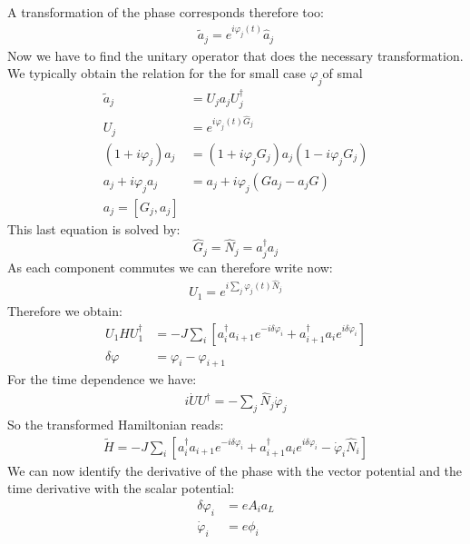 \documentclass[10pt]{article}
\newcommand{\ch}{e}
\newcommand{\aL}{a_L}
\begin{document}
A transformation of the phase corresponds therefore too:
\begin{align}
\tilde{a}_j = e^{i\varphi_j(t)}\hat{a}_j
\end{align}
Now we have to find the unitary operator that does the necessary transformation. We typically obtain the relation for the for small  case $\varphi_j$of smal
\begin{eqnarray}
\tilde{a}_j &= U_j a_j U_j^\dag\\
U_j &= e^{i\varphi_j(t)\hat{G}_j}\\
(1+i\varphi_j)a_j &= (1+i\varphi_j G_j)a_j (1-i\varphi_j G_j)\\
a_j +i\varphi_ja_j &= a_j + i\varphi_j (Ga_j - a_jG)\\
 a_j = [G_j,a_j]
\end{eqnarray}
This last equation is solved by:
\begin{equation}
\hat{G}_j = \hat{N}_j = a^\dag_j a_j
\end{equation}
As each component commutes we can therefore write now:
\begin{align}
U_1 = e^{i\sum_j \varphi_j(t) \hat{N}_j}
\end{align}
Therefore we obtain:
\begin{eqnarray}
U_1HU_1^\dag &= -J\sum_i \left[a_i^\dag a_{i+1} e^{-i\delta \varphi_i} +a_{i+1}^\dag a_i e^{i\delta \varphi_i} \right]\\
\delta \varphi &= \varphi_i-\varphi_{i+1}
\end{eqnarray}
For the time dependence we have:
\begin{align}
i\dot{U}U^\dag = -\sum_j \hat{N}_j \dot{\varphi}_j
\end{align}
So the transformed Hamiltonian reads:
 \begin{align}\label{Eq:LatticeWithMagField}
 \tilde{H} = -J\sum_i \left[a_i^\dag a_{i+1} e^{-i\delta \varphi_i} +a_{i+1}^\dag a_i e^{i\delta \varphi_i} - \dot{\varphi}_i \hat{N}_i\right]
 \end{align}
 We can now identify the derivative of the phase with  the vector potential and the time derivative with the scalar potential:
 \begin{eqnarray}
 \delta \varphi_i &= \ch A_i \aL\\
 \dot{\varphi}_i &=  \ch\phi_i
 \end{eqnarray}
\end{document}
